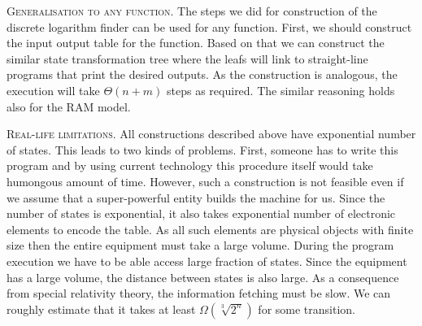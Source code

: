 \documentclass{crypto-exercise}
\begin{document}
\begin{solution}
\vspace*{2ex}
\noindent\textsc{Generalisation to any function.}
The steps we did for construction of the discrete logarithm finder can be used for any function. First, we should construct the input output table for the function. Based on that we can construct the similar state transformation tree where the leafs will link to straight-line programs that print the desired outputs. As the construction is analogous, the execution will take $\Theta(n+m)$ steps as required. The similar reasoning holds also for the RAM model.
 
\vspace*{2ex}
\noindent\textsc{Real-life limitations.} 
All constructions described above have exponential number of states. This leads to two kinds of problems. First, someone has to write this program and by using current technology this procedure itself would take humongous amount of time. However, such a construction is not feasible even if we assume that a super-powerful entity builds the machine for us. Since the number of states is exponential, it also takes exponential number of electronic elements to encode the table. As all such elements are physical objects with finite size then the entire equipment must take a large volume. During the program execution we have to be able access large fraction of states. Since the equipment has a large volume, the distance between states is also large. As a consequence from special relativity theory, the information fetching must be slow. We can roughly estimate that it takes at least $\Omega(\sqrt[3]{2^{n}})$ for some transition.

\end{solution}
\end{document}
